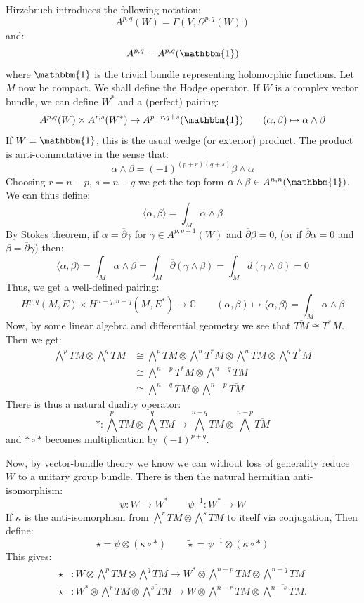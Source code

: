 \documentclass{book}
\newcommand{\C}{{\mathbb{C}}}
\begin{document}
Hirzebruch introduces the following notation:
\[
  A^{p,q}(W) = \Gamma(V, \Omega^{p,q}(W))
\]
and:
\[
  A^{p,q} = A^{p,q}(\mathbbm{1})
\]
where $\mathbbm{1}$ is the trivial bundle representing holomorphic functions.
Let $M$ now be compact. We shall define the Hodge operator. If $W$ is a complex vector bundle, we can define
$W^*$ and a (perfect) pairing:
\[
  A^{p,q}(W) \times A^{r,s}(W^*) \to A^{p+r, q+s}(\mathbbm{1}) \qquad (\alpha,\beta) \mapsto \alpha\wedge
\beta
\]
If $W = \mathbbm{1}$, this is the usual wedge (or exterior) product. The product is anti-commutative in the
sense that:
\[
  \alpha \wedge \beta = (-1)^{(p+r)(q+s)} \beta \wedge  \alpha
\]
Choosing $r = n-p$, $s = n-q$ we get the top form $\alpha \wedge  \beta \in A^{n,n}(\mathbbm{1})$. We can
thus define:
\[
  \langle \alpha,\beta \rangle = \int_M \alpha \wedge \beta
\]
By Stokes theorem, if $\alpha = \overline{\partial}\gamma$ for $\gamma \in A^{p, q-1}(W)$ and
$\overline{\partial}\beta = 0$, (or if $\overline{\partial}\alpha = 0$ and $\beta
= \overline{\partial}\gamma$) then:
\[
  \langle \alpha,\beta \rangle = \int_M \alpha \wedge \beta = \int_M \overline{\partial}(\gamma \wedge \beta)
  = \int_M d \left(\gamma \wedge  \beta\right) = 0
\]
Thus, we get a well-defined pairing:
\[
  H^{p,q}(M,E) \times H^{n-q, n-q}(M, E^*) \to \C\qquad (\alpha, \beta) \mapsto \langle \alpha,\beta \rangle
  = \int_M \alpha \wedge  \beta
\]
Now, by some linear algebra and differential geometry we see that $\overline{TM} \cong T^*M$. Then we get:
\begin{align*}
\bigwedge^p TM \otimes \bigwedge^q TM &\cong \bigwedge^p TM \otimes \bigwedge^n T^*M \otimes \bigwedge^n TM \otimes \bigwedge^q T^*M \\
&\cong \bigwedge^{n-p} T^*M \otimes \bigwedge^{n-q} TM \\
&\cong \bigwedge^{n-q} TM \otimes \bigwedge^{n-p} \overline{TM}
\end{align*}
There is thus a natural duality operator:
\[
  *: \bigwedge^p TM \otimes \bigwedge^q TM \to \bigwedge^{n-q} TM \otimes \bigwedge^{n-p} \overline{TM}
\]
and $*\circ *$ becomes multiplication by $(-1)^{p+q}$.

Now, by vector-bundle theory we know we can without loss of generality reduce $W$ to a unitary group bundle.
There is then the natural hermitian anti-isomorphism:
\[
  \psi: W \to W^* \qquad \psi^{-1}: W^* \to W
\]
If $\kappa$ is the anti-isomorphism from $\bigwedge^r TM \otimes \overline{\bigwedge^s TM}$ to itself via
conjugation, Then define:
\[
  \star = \psi \otimes (\kappa \circ *) \qquad \widetilde{\star} = \psi^{-1} \otimes (\kappa \circ *)
\]
This gives:
\begin{align*}
\star &: W \otimes \bigwedge^p TM \otimes \overline{\bigwedge^q TM} \to W^* \otimes \bigwedge^{n-p} TM \otimes \overline{\bigwedge^{n-q} TM} \\
\widetilde{\star} &: W^* \otimes \bigwedge^r TM \otimes \overline{\bigwedge^s TM} \to W \otimes \bigwedge^{n-r} TM \otimes \overline{\bigwedge^{n-s} TM}.
\end{align*}
\end{document}
